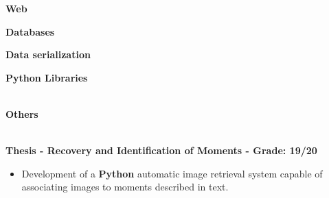 \documentclass[10pt,a4paper,ragged2e,withhyper]{altacv}
\begin{document}
\begin{paracol}{2}
      \textbf{Web}
      \newline \medbreak
      \\ \smallbreak
      \newline \medbreak

      \textbf{Databases}
      \newline \medbreak
       \\ \smallbreak
      \newline \medbreak

      \textbf{Data serialization}
      \newline \medbreak
      \newline \medbreak

      \textbf{Python Libraries}
      \newline \medbreak
       \\ \smallbreak
       \\ \smallbreak
      \newline \medbreak

      \textbf{Others}
      \newline \medbreak
      \\ \smallbreak
      \\ \smallbreak
       \smallbreak

\end{paracol}



\textbf{Thesis - Recovery and Identification of Moments - Grade: 19/20}
\smallskip
\begin{itemize}
      \item Development of a \textbf{Python} automatic image retrieval system capable of
            associating images to moments described in text.

\end{itemize}
\end{document}
